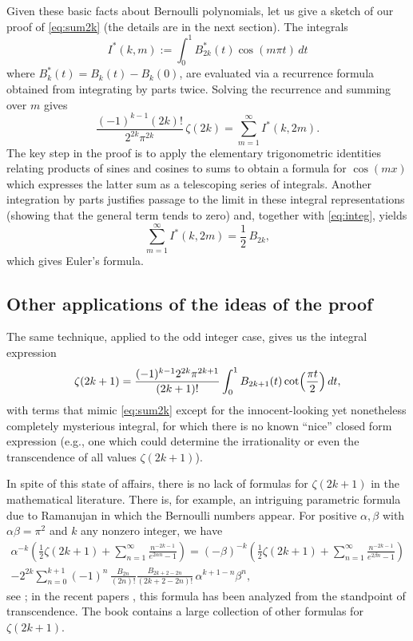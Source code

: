 \documentclass[10pt,reqno]{amsart}
\theoremstyle{remark}
\begin{document}
Given these basic facts about Bernoulli polynomials, let us give a sketch of our proof of \eqref{eq:sum2k} (the details are in the next section). The integrals
\[
  I^{*}(k,m) := \int_0^{1} B_{2k}^{*}(t) \cos(m\pi t)\,dt
\]
where $B_{k}^{*}(t) = B_{k}(t) - B_{k}(0)$, are evaluated via a recurrence formula obtained
from integrating by parts twice. Solving the recurrence and summing over $m$ gives
\[
  \frac{(-1)^{k-1}(2k)!}{2^{2k} \pi^{2k}} \, \zeta(2k) = \sum_{m=1}^{\infty} I^{*}(k,2m).
\]
The key step in the proof is to apply the elementary trigonometric identities relating products of sines and cosines to sums to obtain a formula for $\cos(m x)$ which expresses the latter sum as a telescoping series of integrals. Another integration by parts justifies passage to the limit in these integral representations (showing that the general term tends to zero) and, together with \eqref{eq:integ}, yields
\[
  \sum_{m=1}^{\infty} I^{*}(k,2m) = \frac{1}{2}\,B_{2k},
\]
which gives Euler's formula.


\subsection{Other applications of the ideas of the proof}

The same technique, applied to the odd integer case, gives us the integral expression
\cite[formula 23.2.17]{AS}
\[
  \zeta(2k+1) = \frac{(-1)^{k-1}2^{2k}\pi^{2k+1}}{(2k+1)!}
  \int_0^{1} B_{2k+1}(t) \cot\Bigl(\frac{\pi t}{2}\Bigr)\,dt,
\]
with terms that mimic \eqref{eq:sum2k} except for the innocent-looking yet nonetheless completely mysterious integral, for which there is no known ``nice'' closed form expression (e.g., one which could determine the irrationality or even the transcendence of all values $\zeta(2k+1)$). 

In spite of this state of affairs, there is no lack of formulas for $\zeta(2k+1)$ in the mathematical literature. There is, for example, an intriguing parametric formula due to Ramanujan in which the Bernoulli numbers appear. For positive $\alpha,\beta$ with $\alpha\beta=\pi^2$ and $k$ any nonzero integer, we have
\begin{multline*}
  \alpha^{-k} \left( \tfrac12 \zeta(2k+1) + \sum_{n=1}^{\infty} \frac{n^{-2k-1}}{e^{2\alpha n}-1} \right) 
  = (-\beta)^{-k} \left( \tfrac12 \zeta(2k+1) + \sum_{n=1}^{\infty} \frac{n^{-2k-1}}{e^{2\beta n}-1} \right) \\
  - 2^{2k} \sum_{n=0}^{k+1} (-1)^n \,\frac{B_{2n}}{(2n)!} \frac{B_{2k+2-2n}}{(2k+2-2n)!}\, \alpha^{k+1-n} \beta^n,
\end{multline*}
see \cite[Entry 21 (i) on page 275]{Ber}; in the recent papers \cite{MSW, GMR}, this formula has been analyzed from the standpoint of transcendence.
The book \cite[Section 4.2]{SrCh} contains a large collection of other formulas for $\zeta(2k+1)$.
\end{document}

